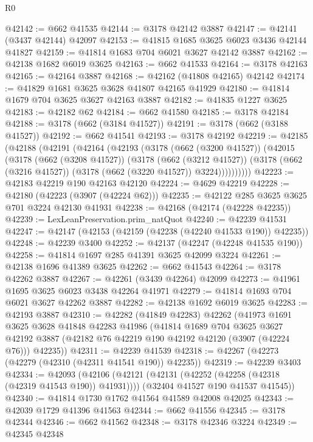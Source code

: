 \begin{lexlean}{R0}
\begin{coremodule}
@42142 := @662 @41535
@42144 := @3178 @42142 @3887
@42147 := @42141 (@3437 @42144) @42097
@42153 := @41815 @1685 @3625 @6023 @3436 @42144 @41827
@42159 := @41814 @1683 @704 @6021 @3627 @42142 @3887
@42162 := @42138 @1682 @6019 @3625
@42163 := @662 @41533
@42164 := @3178 @42163
@42165 := @42164 @3887
@42168 := @42162 (@41808 @42165) @42142
@42174 := @41829 @1681 @3625 @3628 @41807 @42165 @41929
@42180 := @41814 @1679 @704 @3625 @3627 @42163 @3887
@42182 := @41835 @1227 @3625
@42183 := @42182 @62
@42184 := @662 @41580
@42185 := @3178 @42184
@42188 := @3178 (@662 (@3184 @41527))
@42191 := @3178 (@662 (@3188 @41527))
@42192 := @662 @41541
@42193 := @3178 @42192
@42219 := @42185
    (@42188
      (@42191
        (@42164
          (@42193
            (@3178
              (@662 (@3200 @41527))
              (@42015
                (@3178
                  (@662 (@3208 @41527))
                  (@3178
                    (@662 (@3212 @41527))
                    (@3178 (@662 (@3216 @41527)) (@3178 (@662 (@3220 @41527)) @3224))))))))))
@42223 := @42183 @42219 @190 @42163 @42120
@42224 := @4629 @42219
@42228 := @42180 (@42223 (@3907 (@42224 @62)))
@42235 := @42122 @285 @3625 @3625 @701 @3224 @42130 @41931
@42238 := @42168 (@42174 (@42228 @42235))
@42239 := LexLeanPreservation.prim_natQuot
@42240 := @42239 @41531
@42247 := @42147 (@42153 (@42159 (@42238 (@42240 @41533 @190)) @42235))
@42248 := @42239 @3400
@42252 := @42137 (@42247 (@42248 @41535 @190))
@42258 := @41814 @1697 @285 @41391 @3625 @42099 @3224
@42261 := @42138 @1696 @41389 @3625
@42262 := @662 @41543
@42264 := @3178 @42262 @3887
@42267 := @42261 (@3439 @42264) @42099
@42273 := @41961 @1695 @3625 @6023 @3438 @42264 @41971
@42279 := @41814 @1693 @704 @6021 @3627 @42262 @3887
@42282 := @42138 @1692 @6019 @3625
@42283 := @42193 @3887
@42310 := @42282
    (@41849 @42283)
    @42262
    (@41973
      @1691
      @3625
      @3628
      @41848
      @42283
      @41986
      (@41814
        @1689
        @704
        @3625
        @3627
        @42192
        @3887
        (@42182 @76 @42219 @190 @42192 @42120 (@3907 (@42224 @76)))
        @42235))
@42311 := @42239 @41539
@42318 := @42267 (@42273 (@42279 (@42310 (@42311 @41541 @190)) @42235))
@42319 := @42239 @3403
@42334 := @42093
    (@42106
      (@42121 (@42131 (@42252 (@42258 (@42318 (@42319 @41543 @190)) @41931))))
      (@32404 @41527 @190 @41537 @41545))
@42340 := @41814 @1730 @1762 @41564 @41589 @42008 @42025
@42343 := @42039 @1729 @41396 @41563
@42344 := @662 @41556
@42345 := @3178 @42344
@42346 := @662 @41562
@42348 := @3178 @42346 @3224
@42349 := @42345 @42348

\end{coremodule}
\end{lexlean}
